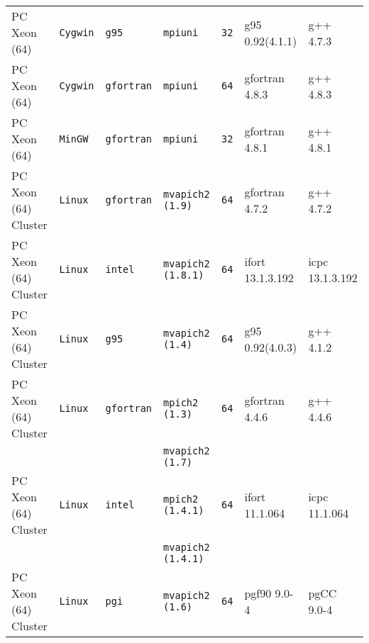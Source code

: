 \begin{longtable}{lllllll}
PC Xeon (64)          &\tt Cygwin &\tt g95          &\tt mpiuni           &\tt 32           & g95 \footnotesize 0.92(4.1.1)       & g++  \footnotesize 4.7.3        \\ %
PC Xeon (64)          &\tt Cygwin &\tt gfortran     &\tt mpiuni           &\tt 64           & gfortran \footnotesize 4.8.3        & g++  \footnotesize 4.8.3        \\ %
PC Xeon (64)          &\tt MinGW  &\tt gfortran     &\tt mpiuni           &\tt 32           & gfortran \footnotesize 4.8.1        & g++  \footnotesize 4.8.1        \\ %
PC Xeon (64) Cluster  &\tt Linux  &\tt gfortran     &\tt mvapich2 (1.9)   &\tt 64           & gfortran \footnotesize 4.7.2        & g++ \footnotesize 4.7.2         \\ %
PC Xeon (64) Cluster  &\tt Linux  &\tt intel        &\tt mvapich2 (1.8.1) &\tt 64           & ifort \footnotesize 13.1.3.192      & icpc \footnotesize 13.1.3.192   \\ %
PC Xeon (64) Cluster  &\tt Linux  &\tt g95          &\tt mvapich2 (1.4)   &\tt 64           & g95 \footnotesize 0.92(4.0.3)       & g++ \footnotesize 4.1.2         \\ %
PC Xeon (64) Cluster  &\tt Linux  &\tt gfortran     &\tt mpich2 (1.3)     &\tt 64           & gfortran \footnotesize 4.4.6        & g++ \footnotesize 4.4.6         \\ %
                      &           &                 &\tt mvapich2 (1.7)   &                 &                                     &                                 \\
PC Xeon (64) Cluster  &\tt Linux  &\tt intel        &\tt mpich2 (1.4.1)   &\tt 64           & ifort \footnotesize 11.1.064        & icpc \footnotesize 11.1.064     \\ %
                      &           &                 &\tt mvapich2 (1.4.1) &                 &                                     &                                 \\
PC Xeon (64) Cluster  &\tt Linux  &\tt pgi          &\tt mvapich2 (1.6)   &\tt 64           & pgf90 \footnotesize 9.0-4           & pgCC \footnotesize 9.0-4        \\ %

\end{longtable}
